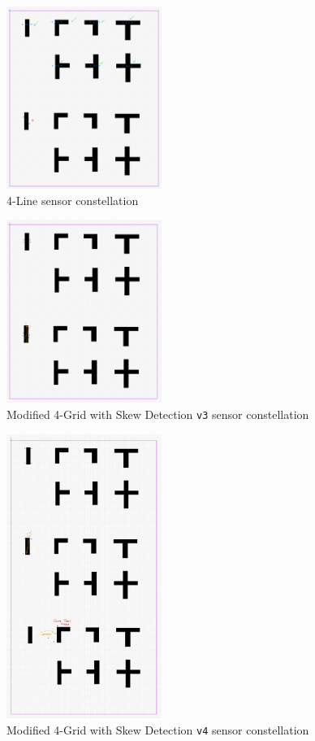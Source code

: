 \documentclass[conference]{IEEEtran}
\begin{document}
\begin{figure}[H]
	\centerline{\includegraphics[width=0.45\textwidth]{constellation-4-line.png}}
	\caption{4-Line sensor constellation}
	\label{fig:constellation-4-line}
\end{figure}
\begin{figure}[H]
	\centerline{\includegraphics[width=0.45\textwidth]{constellation-4-skew-v3.png}}
	\caption{Modified 4-Grid with Skew Detection \texttt{v3} sensor constellation}
	\label{fig:constellation-4-skew-v3}
\end{figure}
\begin{figure}[H]
	\centerline{\includegraphics[width=0.45\textwidth]{constellation-4-skew-v4.png}}
	\caption{Modified 4-Grid with Skew Detection \texttt{v4} sensor constellation}
	\label{fig:constellation-4-skew-v4}
\end{figure}
\end{document}
